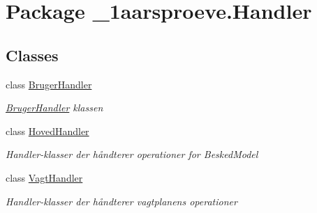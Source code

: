 \hypertarget{namespace__1aarsproeve_1_1_handler}{}\section{Package \+\_\+1aarsproeve.\+Handler}
\label{namespace__1aarsproeve_1_1_handler}
\subsection*{Classes}
\begin{DoxyCompactItemize}
\item 
class \hyperlink{class__1aarsproeve_1_1_handler_1_1_bruger_handler}{Bruger\+Handler}
\begin{DoxyCompactList}\small\item\em \hyperlink{class__1aarsproeve_1_1_handler_1_1_bruger_handler}{Bruger\+Handler} klassen \end{DoxyCompactList}\item 
class \hyperlink{class__1aarsproeve_1_1_handler_1_1_hoved_handler}{Hoved\+Handler}
\begin{DoxyCompactList}\small\item\em Handler-\/klasser der håndterer operationer for Besked\+Model \end{DoxyCompactList}\item 
class \hyperlink{class__1aarsproeve_1_1_handler_1_1_vagt_handler}{Vagt\+Handler}
\begin{DoxyCompactList}\small\item\em Handler-\/klasser der håndterer vagtplanens operationer \end{DoxyCompactList}\end{DoxyCompactItemize}
